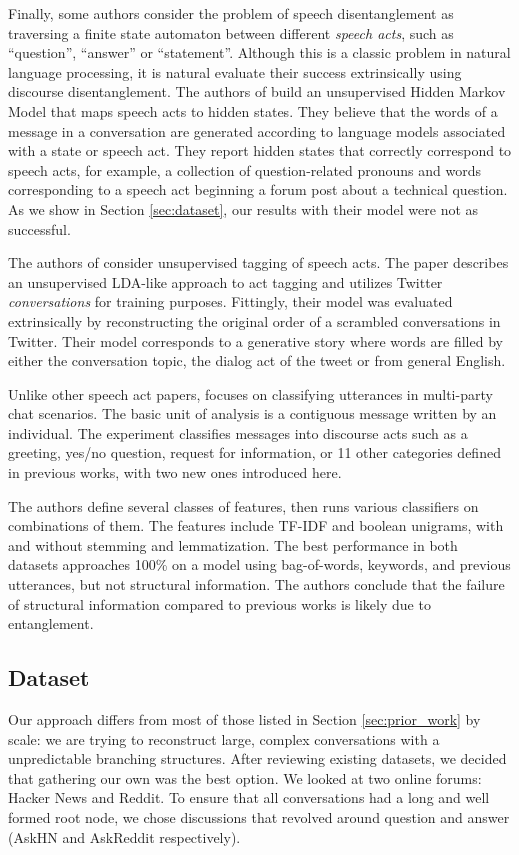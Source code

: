 \documentclass[10pt]{article}
\begin{document}
Finally, some authors consider the problem of speech disentanglement as traversing 
a finite state automaton between different \textit{speech acts}, such as
``question'', ``answer'' or ``statement''. Although this is a classic problem in
natural language processing, it is natural evaluate their success extrinsically 
using discourse disentanglement. The authors of \cite{Paula} build an 
unsupervised Hidden Markov Model that  maps speech acts to hidden states. 
They believe that the words of a message 
in a conversation are generated according to language models associated
with a state or speech act. They report hidden states
that correctly correspond to speech acts, for example, a collection of
question-related pronouns and words corresponding to a speech act beginning a
forum post about a technical question. As we show in Section \ref{sec:dataset}, 
our results with their model were not as successful.

The authors of \cite{Ritter2010a} consider unsupervised tagging of speech acts.
The paper describes an unsupervised LDA-like approach to act tagging 
and utilizes Twitter \textit{conversations} for
training purposes. Fittingly, their model was evaluated 
extrinsically by reconstructing the original order of a scrambled
conversations in Twitter. Their model corresponds to a generative story
where words are filled by either the conversation topic, the dialog
act of the tweet or from general English.

Unlike other speech act papers, \cite{Kim2012} 
focuses on classifying utterances
in multi-party chat scenarios. The basic unit
of analysis is a contiguous message written by an individual. The
experiment classifies messages into discourse acts such as a greeting, yes/no
question, request for information, or 11 other categories defined in previous
works, with two new ones introduced here.

The authors define several classes of features, then runs various classifiers on
combinations of them. The features include TF-IDF and boolean unigrams, with
and without stemming and lemmatization.  The best
performance in both datasets approaches 100\% on a model using bag-of-words,
keywords, and previous utterances, but not structural information. 
The authors conclude that the failure of structural information 
compared to previous works is likely due to entanglement.

\subsection{Dataset}
\label{section:dataset}
Our approach differs from most of those listed in Section \ref{sec:prior_work}
by scale: we are trying to reconstruct large, complex
conversations with a unpredictable branching structures. After reviewing existing datasets,
we decided that gathering our own was the best option. We looked at two
online forums: Hacker News and Reddit. To ensure that all conversations had a long
and well formed root node, we chose discussions that revolved around question and answer 
(AskHN and AskReddit respectively). 
\end{document}
